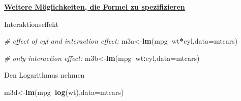 \documentclass[ignorenonframetext,]{beamer}
\newenvironment{Shaded}{\begin{snugshade}}{\end{snugshade}}
\newcommand{\CommentTok}[1]{\textcolor[rgb]{0.56,0.35,0.01}{\textit{#1}}}
\newcommand{\DataTypeTok}[1]{\textcolor[rgb]{0.13,0.29,0.53}{#1}}
\newcommand{\KeywordTok}[1]{\textcolor[rgb]{0.13,0.29,0.53}{\textbf{#1}}}
\newcommand{\NormalTok}[1]{#1}
\newcommand{\OperatorTok}[1]{\textcolor[rgb]{0.81,0.36,0.00}{\textbf{#1}}}
\begin{document}
\begin{frame}[fragile]{\href{https://cran.r-project.org/web/packages/Formula/vignettes/Formula.pdf}{\textbf{Weitere
Möglichkeiten, die Formel zu spezifizieren}}}
\protect\hypertarget{weitere-moglichkeiten-die-formel-zu-spezifizieren}{}

\begin{block}{Interaktionseffekt}

\begin{Shaded}
\begin{Highlighting}[]
\CommentTok{# effect of cyl and interaction effect:}
\NormalTok{m3a<-}\KeywordTok{lm}\NormalTok{(mpg}\OperatorTok{~}\NormalTok{wt}\OperatorTok{*}\NormalTok{cyl,}\DataTypeTok{data=}\NormalTok{mtcars) }

\CommentTok{# only interaction effect:}
\NormalTok{m3b<-}\KeywordTok{lm}\NormalTok{(mpg}\OperatorTok{~}\NormalTok{wt}\OperatorTok{:}\NormalTok{cyl,}\DataTypeTok{data=}\NormalTok{mtcars) }
\end{Highlighting}
\end{Shaded}

\end{block}

\begin{block}{Den Logarithmus nehmen}

\begin{Shaded}
\begin{Highlighting}[]
\NormalTok{m3d<-}\KeywordTok{lm}\NormalTok{(mpg}\OperatorTok{~}\KeywordTok{log}\NormalTok{(wt),}\DataTypeTok{data=}\NormalTok{mtcars) }
\end{Highlighting}
\end{Shaded}

\end{block}

\end{frame}
\end{document}
